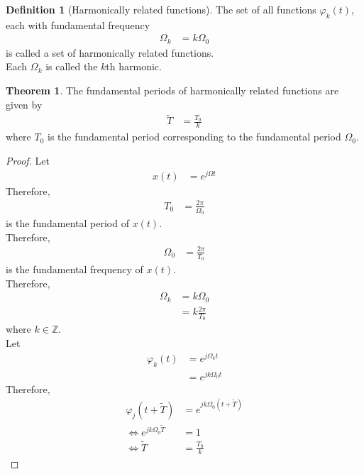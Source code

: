 \documentclass[titlepage, fleqn, a4paper, 12pt, twoside]{article}
\theoremstyle{definition}
\newtheorem{definition}{Definition}
\theoremstyle{theorem}
\newtheorem{theorem}{Theorem}
\renewcommand{\tilde}{\widetilde}
\begin{document}
\begin{definition}[Harmonically related functions]
	The set of all functions $\varphi_k(t)$, each with fundamental frequency
	\begin{align*}
		\Omega_k & = k \Omega_0
	\end{align*}
	is called a set of harmonically related functions.\\
	Each $\Omega_k$ is called the $k$th harmonic.
\end{definition}

\begin{theorem}
	The fundamental periods of harmonically related functions are given by
	\begin{align*}
		\tilde{T} & = \frac{T_0}{k}
	\end{align*}
	where $T_0$ is the fundamental period corresponding to the fundamental period $\Omega_0$.
\end{theorem}

\begin{proof}
	Let
	\begin{align*}
		x(t) & = e^{j \Omega t}
	\end{align*}
	Therefore,
	\begin{align*}
		T_0 & = \frac{2 \pi}{\Omega_0}
	\end{align*}
	is the fundamental period of $x(t)$.\\
	Therefore,
	\begin{align*}
		\Omega_0 & = \frac{2 \pi}{T_0}
	\end{align*}
	is the fundamental frequency of $x(t)$.\\
	Therefore,
	\begin{align*}
		\Omega_k & = k \Omega_0 \\
                         & = k \frac{2 \pi}{T_0}
	\end{align*}
	where $k \in \mathbb{Z}$.\\
	Let
	\begin{align*}
		\varphi_k(t) & = e^{j \Omega_k t} \\
                             & = e^{j k \Omega_0 t}
	\end{align*}
	Therefore,
	\begin{align*}
		\varphi_j(t + \tilde{T})        & = e^{j k \Omega_0 (t + \tilde{T})} \\
		\iff e^{j k \Omega_0 \tilde{T}} & = 1                                \\
		\iff \tilde{T}                  & = \frac{T_0}{k}
	\end{align*}
\end{proof}
\end{document}
